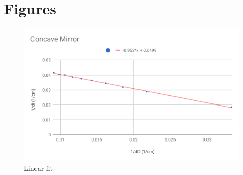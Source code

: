 \section{Figures}
\begin{figure}[ht]
    \centering
    \includegraphics[scale=0.74]{image/07-mirrors/chart.pdf}
    \caption{Linear fit}
    \label{figure.07.chart}
\end{figure}
